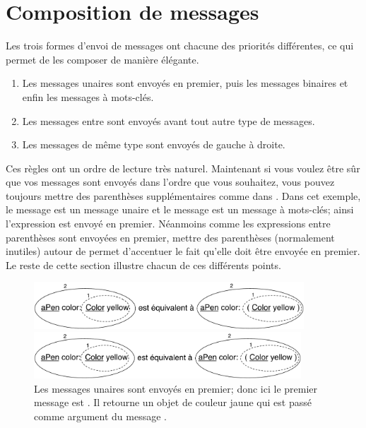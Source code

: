 \documentclass[a4paper,10pt,twoside]{book}
\begin{document}

\section{Composition de messages}
Les trois formes d'envoi de messages ont chacune des priorités différentes, ce qui permet de les composer de manière élégante.

\begin{enumerate}
\item Les messages unaires sont envoyés en premier, puis les messages binaires et enfin les messages à mots-clés.
\item Les messages entre  sont envoyés avant tout autre type de messages. 
\item Les messages de même type sont envoyés de gauche à droite. 
\end{enumerate}

Ces règles ont un ordre de lecture très naturel. Maintenant si
vous voulez être sûr que vos messages sont envoyés dans l'ordre
que vous souhaitez, vous pouvez toujours mettre des parenthèses
supplémentaires comme dans . Dans cet exemple, le
message  est un message unaire et le message 
est un message à mots-clés; ainsi l'expression 
est envoyé en premier. Néanmoins comme les expressions entre
parenthèses sont envoyées en premier, mettre des parenthèses
(normalement inutiles) autour de  permet d'accentuer
le fait qu'elle
doit être envoyée en premier. Le reste de cette section illustre
chacun de ces différents points.

\begin{figure}[ht]
\ifluluelse
	{\centerline{\includegraphics[width=0.9\textwidth]{uKeyUn}} }
	{\centerline{\includegraphics[width=10cm]{uKeyUn}} }
\caption{Les messages unaires sont envoyés en premier; donc ici le
  premier message est . Il retourne un objet de
  couleur jaune qui est passé comme argument du message .}
\end{figure}
\end{document}
